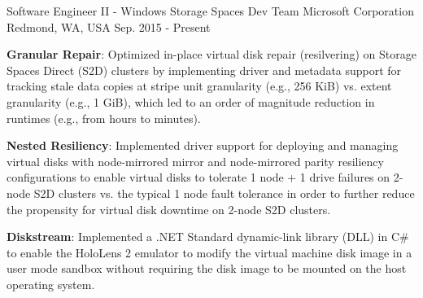

\begin{cventries}

  \cventry
    {Software Engineer II - Windows Storage Spaces Dev Team} %
    {Microsoft Corporation} %
    {Redmond, WA, USA} %
    {Sep. 2015 - Present} %
    {
      \begin{cvitems} %
        \item {
          \textbf{Granular Repair}: Optimized in-place virtual disk repair (resilvering) on Storage
          Spaces Direct (S2D) clusters by implementing driver and metadata support for tracking
          stale data copies at stripe unit granularity (e.g., 256 KiB) vs. extent granularity
          (e.g., 1 GiB), which led to an order of magnitude reduction in runtimes (e.g., from hours
          to minutes).
        }
        \item {
          \textbf{Nested Resiliency}: Implemented driver support for deploying and managing virtual
          disks with node-mirrored mirror and node-mirrored parity resiliency configurations to
          enable virtual disks to tolerate 1 node + 1 drive failures on 2-node S2D clusters vs. the
          typical 1 node fault tolerance in order to further reduce the propensity for virtual disk
          downtime on 2-node S2D clusters.
        }
        \item {
          \textbf{Diskstream}: Implemented a .NET Standard dynamic-link library (DLL) in C\# to
          enable the HoloLens 2 emulator to modify the virtual machine disk image in a user mode
          sandbox without requiring the disk image to be mounted on the host operating system.
        }
      \end{cvitems}
    }


\end{cventries}
